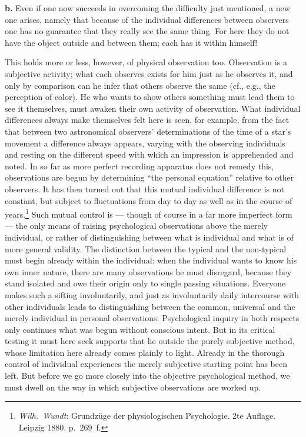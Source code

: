 \documentclass[12pt,a4paper]{book}
\newcommand{\opage}[1]{\marginnote{\footnotesize\textit{[#1]}}}
\begin{document}
\textbf{b.} Even if one now succeeds in overcoming the difficulty just
mentioned, a new one arises, namely that because of the individual
differences between observers one has no guarantee that they really see
the same thing. For here they do not have the object outside and between
them; each has it within himself!

This holds more or less, however, of physical observation too.
Observation is a subjective activity; what each observes exists for him
just as he observes it, and only by comparison can he infer that others
observe the same (cf., e.g., the perception of color). He who wants to
show others something must lead them to see it themselves, must awaken
their own activity of observation. What individual differences always
make themselves felt here is seen, for example, from the fact that
between two astronomical observers' determinations of the time of a
star's movement a difference always appears, varying with the observing
individuals and resting on the different speed with which an impression
is apprehended and noted. In so far as more perfect recording apparatus
does not remedy this, observations are begun by determining ``the
personal equation'' relative to other observers. It has then turned out
that this mutual individual difference is not constant, but subject to
fluctuations from day to day as well as in the course of
years.\footnote{\emph{Wilh.\ Wundt}: Grundzüge der physiologischen
Psychologie. 2te Auflage. Leipzig 1880. p.~269~f.} Such mutual
\opage{22}control is --- though of course in a far more imperfect form ---
the only means of raising psychological observations above the merely
individual, or rather of distinguishing between what is individual and
what is of more general validity. The distinction between the typical
and the non-typical must begin already within the individual: when the
individual wants to know his own inner nature, there are many
observations he must disregard, because they stand isolated and owe
their origin only to single passing situations. Everyone makes such a
sifting involuntarily, and just as involuntarily daily intercourse with
other individuals leads to distinguishing between the common, universal
and the merely individual in personal observations. Psychological
inquiry in both respects only continues what was begun without conscious
intent. But in its critical testing it must here seek supports that lie
outside the purely subjective method, whose limitation here already
comes plainly to light. Already in the thorough control of individual
experiences the merely subjective starting point has been left. But
before we go more closely into the objective psychological method, we
must dwell on the way in which subjective observations are worked up.
\end{document}
